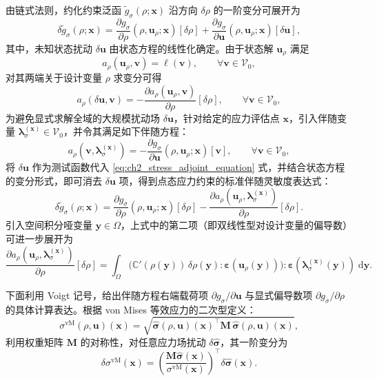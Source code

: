 由链式法则，约化约束泛函 $\tilde{g}_\sigma(\rho;\boldsymbol{x})$ 沿方向 $\delta\rho$ 的一阶变分可展开为
\[
\delta \tilde g_\sigma(\rho;\boldsymbol{x}) = \frac{\partial g_\sigma}{\partial \rho}(\rho,\boldsymbol{u}_\rho;\boldsymbol{x})[\delta\rho] + \frac{\partial g_\sigma}{\partial \boldsymbol{u}}(\rho,\boldsymbol{u}_\rho;\boldsymbol{x})[\delta\boldsymbol{u}],
\]
其中，未知状态扰动 $\delta\boldsymbol{u}$ 由状态方程的线性化确定。由于状态解 $\boldsymbol{u}_\rho$ 满足
\[
a_\rho(\boldsymbol{u}_\rho,\boldsymbol{v})=\ell(\boldsymbol{v}),\qquad \forall \boldsymbol{v}\in \mathcal{V}_0,
\]
对其两端关于设计变量 $\rho$ 求变分可得
\[
a_\rho(\delta\boldsymbol{u},\boldsymbol{v}) = -\frac{\partial a_\rho(\boldsymbol{u}_\rho,\boldsymbol{v})}{\partial \rho}[\delta\rho], \qquad \forall \boldsymbol{v}\in \mathcal{V}_0,
\]
为避免显式求解全域的大规模扰动场 $\delta\boldsymbol{u}$，针对给定的应力评估点 $\boldsymbol{x}$，引入伴随变量 $\boldsymbol{\lambda}_\sigma^{(\boldsymbol{x})}\in \mathcal{V}_0$，并令其满足如下伴随方程：
\begin{equation} 
	a_\rho(\boldsymbol{v},\boldsymbol{\lambda}_\sigma^{(\boldsymbol{x})}) = -\frac{\partial g_\sigma}{\partial \boldsymbol{u}}(\rho,\boldsymbol{u}_\rho;\boldsymbol{x})[\boldsymbol{v}], \qquad \forall \boldsymbol{v}\in \mathcal{V}_0,
	\label{eq:ch2_stress_adjoint_equation}
\end{equation}
将 $\delta\boldsymbol{u}$ 作为测试函数代入 \eqref{eq:ch2_stress_adjoint_equation} 式，并结合状态方程的变分形式，即可消去 $\delta\boldsymbol{u}$ 项，得到点态应力约束的标准伴随灵敏度表达式：
\begin{equation} \label{eq:ch2_stress_sensitivity_standard}
	\delta \tilde{g}_\sigma(\rho;\boldsymbol{x}) = \frac{\partial g_\sigma}{\partial \rho}(\rho,\boldsymbol{u}_\rho;\boldsymbol{x})[\delta\rho] - \frac{\partial a_\rho(\boldsymbol{u}_\rho,\boldsymbol{\lambda}_\sigma^{(\boldsymbol{x})})}{\partial \rho}[\delta\rho].
\end{equation}
引入空间积分哑变量 $\boldsymbol{y} \in \Omega$，上式中的第二项（即双线性型对设计变量的偏导数）可进一步展开为
\[
\frac{\partial a_\rho(\boldsymbol{u}_\rho,\boldsymbol{\lambda}_\sigma^{(\boldsymbol{x})})}{\partial \rho}[\delta\rho] = \int_{\Omega} \big(\mathbb{C}'(\rho(\boldsymbol{y}))\,\delta\rho(\boldsymbol{y}) : \boldsymbol{\varepsilon}(\boldsymbol{u}_\rho(\boldsymbol{y}))\big) : \boldsymbol{\varepsilon}(\boldsymbol{\lambda}_\sigma^{(\boldsymbol{x})}(\boldsymbol{y}))\; \mathrm{d}\boldsymbol{y}.
\]

下面利用 Voigt 记号，给出伴随方程右端载荷项 $\partial g_\sigma / \partial \boldsymbol{u}$ 与显式偏导数项 $\partial g_\sigma / \partial \rho$ 的具体计算表达。根据 von Mises 等效应力的二次型定义：
\[
\sigma^{\mathrm{vM}}(\rho,\boldsymbol{u})(\boldsymbol{x}) = \sqrt{ \hat{\boldsymbol{\sigma}}(\rho,\boldsymbol{u})(\boldsymbol{x})^{\top}\boldsymbol{M}\, \hat{\boldsymbol{\sigma}}(\rho,\boldsymbol{u})(\boldsymbol{x}) },
\]
利用权重矩阵 $\boldsymbol{M}$ 的对称性，对任意应力场扰动 $\delta\hat{\boldsymbol{\sigma}}$，其一阶变分为
\[
\delta\sigma^{\mathrm{vM}}(\boldsymbol{x}) = \left(\frac{\boldsymbol{M}\hat{\boldsymbol{\sigma}}(\boldsymbol{x})}{\sigma^{\mathrm{vM}}(\boldsymbol{x})}\right)^{\!\top}\delta\hat{\boldsymbol{\sigma}}(\boldsymbol{x}).
\]

